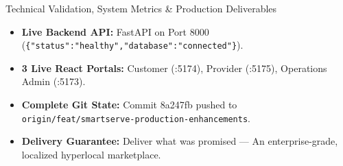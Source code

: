\documentclass[aspectratio=169,11pt]{beamer}
\begin{document}
\begin{frame}{Technical Validation, System Metrics \& Production Deliverables}
\begin{tcolorbox}[colback=white,colframe=SmartGreen,arc=3mm,title=\textbf{\scriptsize LIVE PRODUCTION DELIVERABLES SUMMARY}]
  \begin{itemize}\setlength\itemsep{0.2em}
    \item \textbf{\scriptsize Live Backend API:} FastAPI on Port 8000 (\texttt{\{"status":"healthy","database":"connected"\}}).
    \item \textbf{\scriptsize 3 Live React Portals:} Customer (:5174), Provider (:5175), Operations Admin (:5173).
    \item \textbf{\scriptsize Complete Git State:} Commit 8a247fb pushed to \texttt{origin/feat/smartserve-production-enhancements}.
    \item \textbf{\scriptsize Delivery Guarantee:} Deliver what was promised --- An enterprise-grade, localized hyperlocal marketplace.
  \end{itemize}
\end{tcolorbox}
\end{frame}
\end{document}
